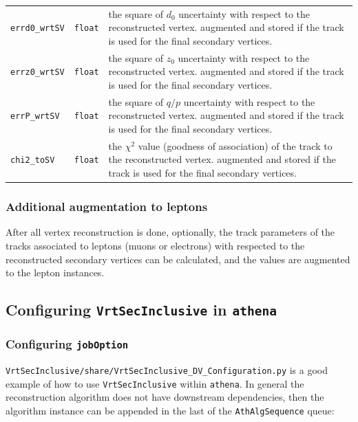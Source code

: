 \begin{table}[htbp]
\begin{tabular}{llp{11cm}}
{\tt errd0\_wrtSV} & {\tt float} & the square of $d_{0}$ uncertainty with respect to the reconstructed vertex. augmented and stored if the track is used for the final secondary vertices.\\
{\tt errz0\_wrtSV} & {\tt float} & the square of $z_{0}$ uncertainty with respect to the reconstructed vertex. augmented and stored if the track is used for the final secondary vertices.\\
{\tt errP\_wrtSV} & {\tt float} & the square of $q/p$ uncertainty with respect to the reconstructed vertex. augmented and stored if the track is used for the final secondary vertices.\\
{\tt chi2\_toSV} & {\tt float} & the $\chi^{2}$ value (goodness of association) of the track to the reconstructed vertex. augmented and stored if the track is used for the final secondary vertices.\\
\hline
\hline
\end{tabular}
\label{tbl:auxdyn_tracks}
\end{table}%

\subsubsection{Additional augmentation to leptons}
After all vertex reconstruction is done, optionally, the track parameters of the tracks associated to leptons (muons or electrons) with respected to the reconstructed secondary vertices can be calculated, and the values are augmented to the lepton instances.

\subsection{Configuring {\tt VrtSecInclusive} in {\tt athena}}
\label{sec:config}

\subsubsection{Configuring {\tt jobOption}}
{\tt VrtSecInclusive/share/VrtSecInclusive\_DV\_Configuration.py} is a good example of how to use {\tt VrtSecInclusive} within {\tt athena}. In general the reconstruction algorithm does not have downstream dependencies, then the algorithm instance can be appended in the last of the {\tt AthAlgSequence} queue:

